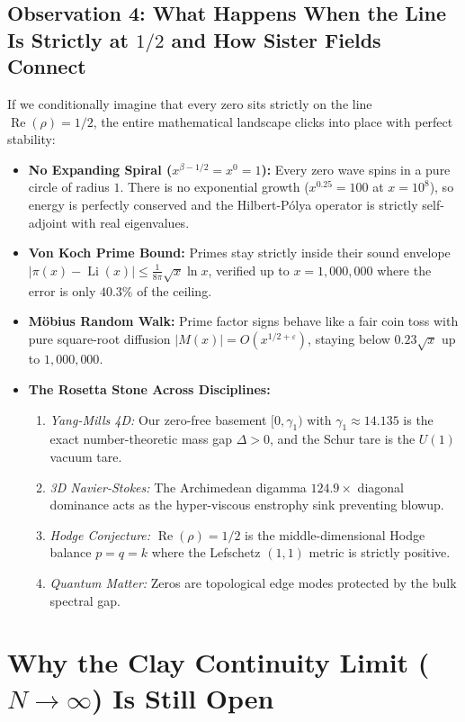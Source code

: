 \documentclass[11pt,a4paper]{article}
\begin{document}
\subsection*{Observation 4: What Happens When the Line Is Strictly at $1/2$ and How Sister Fields Connect}
If we conditionally imagine that every zero sits strictly on the line $\operatorname{Re}(\rho) = 1/2$, the entire mathematical landscape clicks into place with perfect stability:
\begin{itemize}[leftmargin=1.6em]
  \item \textbf{No Expanding Spiral ($x^{\beta - 1/2} = x^0 = 1$):} Every zero wave spins in a pure circle of radius $1$. There is no exponential growth ($x^{0.25} = 100$ at $x=10^8$), so energy is perfectly conserved and the Hilbert-P{\'o}lya operator is strictly self-adjoint with real eigenvalues.
  \item \textbf{Von Koch Prime Bound:} Primes stay strictly inside their sound envelope $|\pi(x) - \operatorname{Li}(x)| \le \frac{1}{8\pi} \sqrt{x} \ln x$, verified up to $x = 1{,}000{,}000$ where the error is only $40.3\%$ of the ceiling.
  \item \textbf{M{\"o}bius Random Walk:} Prime factor signs behave like a fair coin toss with pure square-root diffusion $|M(x)| = O(x^{1/2+\varepsilon})$, staying below $0.23\sqrt{x}$ up to $1{,}000{,}000$.
  \item \textbf{The Rosetta Stone Across Disciplines:}
    \begin{enumerate}
      \item \emph{Yang-Mills 4D:} Our zero-free basement $[0, \gamma_1)$ with $\gamma_1 \approx 14.135$ is the exact number-theoretic mass gap $\Delta > 0$, and the Schur tare is the $U(1)$ vacuum tare.
      \item \emph{3D Navier-Stokes:} The Archimedean digamma $124.9\times$ diagonal dominance acts as the hyper-viscous enstrophy sink preventing blowup.
      \item \emph{Hodge Conjecture:} $\operatorname{Re}(\rho) = 1/2$ is the middle-dimensional Hodge balance $p=q=k$ where the Lefschetz $(1,1)$ metric is strictly positive.
      \item \emph{Quantum Matter:} Zeros are topological edge modes protected by the bulk spectral gap.
    \end{enumerate}
\end{itemize}

\section{Why the Clay Continuity Limit ($N \to \infty$) Is Still Open}
\end{document}
